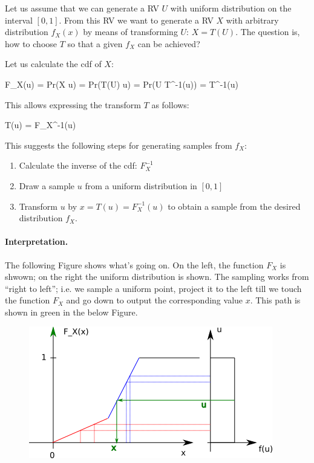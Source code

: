 
Let us assume that we can generate a RV $U$ with uniform distribution on the interval $[0,1]$. From this RV we want to generate a RV $X$ with arbitrary distribution $f_X(x)$ by means of transforming $U$: $X = T(U)$. The question is, how to choose $T$ so that a given $f_X$ can be achieved?

Let us calculate the cdf of $X$:

\bee
F_X(u) = Pr(X \leq u) = Pr(T(U) \leq u) = Pr(U \leq T^{-1}(u)) = T^{-1}(u)
\eee

This allows expressing the transform $T$ as follows:

\bee
T(u) = F_X^{-1}(u)
\eee

This suggests the following steps for generating samples from $f_X$:

\begin{enumerate}

  \item Calculate the inverse of the cdf: $F_X^{-1}$

  \item Draw a sample $u$ from a uniform distribution in $[0,1]$

  \item Transform $u$ by $x = T(u) = F_X^{-1}(u)$ to obtain a sample from the desired distribution $f_X$.

\end{enumerate}

\paragraph{Interpretation.} The following Figure shows what's going on. On the left, the function $F_X$ is shwown; on the right the uniform distribution is shown. The sampling works from ``right to left'';  i.e. we sample a uniform point, project it to the left till we touch the function $F_X$ and go down to output the corresponding value $x$. This path is shown in green in the below Figure.

\begin{figure}[H]
	\includegraphics[scale=1.2]{images/generating_rvs.png}
\end{figure}

